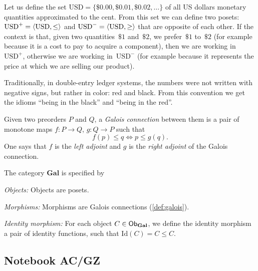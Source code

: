 \begin{example}
   Let us define the set $\text{USD}=\{\$0.00,\$0.01,\$0.02,\dots\}$
   of all US dollars monetary quantities approximated to the cent.
   From this set we can define two posets:
       $\text{USD}^{+} = \langle\text{USD}, \leq\rangle$
       and $\text{USD}^{-} = \langle\text{USD}, \geq\rangle$
       that are opposite of each other.
   If the context is that, given two quantities~$\$1$ and~$\$2$,
   we prefer~$\$1$ to~$\$2$ (for example because it is a cost to pay to acquire a component), then we are working in~$\text{USD}^{+}$,
   otherwise we are working in~$\text{USD}^{-}$ (for example
   because it represents the price at which we are selling our product).

   Traditionally, in double-entry ledger systems, the numbers were not
   written with negative signs, but rather in color: red and black.
   From this convention we get the idioms ``being in the black''
   and ``being in the red''.

\end{example}
\begin{shaded}
\begin{definition}
\label{def:galois}
Given two preorders $P$ and $Q$, a \emph{Galois connection} between them is a pair of monotone maps $f\colon P\to Q$, $g\colon Q\to P$ such that
\begin{equation}
    f(p)\leq q \Leftrightarrow p\leq g(q).
\end{equation}
One says that $f$ is the \emph{left adjoint} and $g$ is the \emph{right adjoint} of the Galois connection.
\end{definition}
\end{shaded}

\begin{definition}
The category $\mathbf{Gal}$ is specified by
\begin{compactenum}
    \item \emph{Objects:} Objects are posets.
    \item \emph{Morphisms:} Morphisms are Galois connections (\cref{def:galois}).
    \item \emph{Identity morphism:} For each object $C\in \operatorname{\mathsf{Ob}}_\mathbf{Gal}$, we define the identity morphism a pair of identity functions, such that $\text{Id}(C)=C\leq C$.
\end{compactenum}
\end{definition}

\newpage
\subsection{Notebook AC/GZ}

